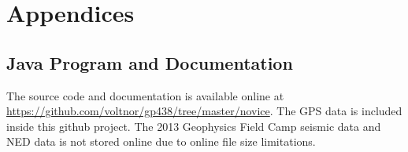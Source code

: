 \documentclass[12pt]{article}
\begin{document}
\newpage
\section{Appendices}

\subsection{Java Program and Documentation}
The source code and documentation is available online at \url{https://github.com/voltnor/gp438/tree/master/novice}. The GPS data is included inside this github project. The 2013 Geophysics Field Camp seismic data and NED data is not stored online due to online file size limitations. 
\end{document}
